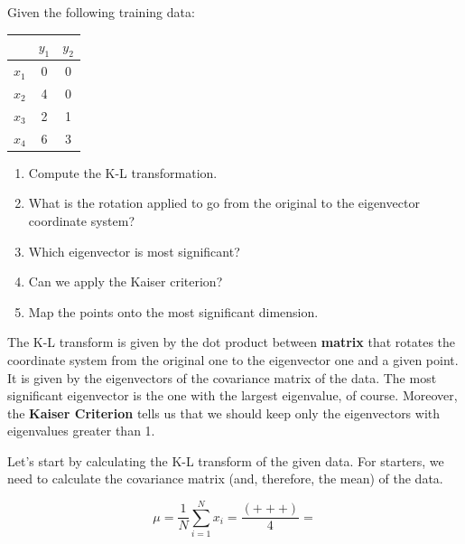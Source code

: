 \documentclass[12pt]{article}
\begin{document}
\begin{enumerate}[leftmargin=\labelsep]
  \begin{tcolorbox}[enhanced jigsaw,halign=center,colback=bg,boxrule=0pt,arc=1pt]
    \item Given the following training data:
    \begin{table}[H]
      \centering
      \begin{tabular}{c|c|c}
              & $y_1$ & $y_2$ \\ \hline
        $x_1$ & 0     & 0     \\
        $x_2$ & 4     & 0     \\
        $x_3$ & 2     & 1     \\
        $x_4$ & 6     & 3
      \end{tabular}
    \end{table}
    \begin{enumerate}
      \item Compute the K-L transformation.
      \item What is the rotation applied to go from the original to the eigenvector
            coordinate system?
      \item Which eigenvector is most significant?
      \item Can we apply the Kaiser criterion?
      \item Map the points onto the most significant dimension.
    \end{enumerate}
  \end{tcolorbox}

  The K-L transform is given by the dot product between \textbf{matrix} that rotates the coordinate system from
  the original one to the eigenvector one and a given point. It is given by the eigenvectors of the
  covariance matrix of the data. The most significant eigenvector is the one with
  the largest eigenvalue, of course. Moreover, the \textbf{Kaiser Criterion} tells us
  that we should keep only the eigenvectors with eigenvalues greater than 1.

  Let's start by calculating the K-L transform of the given data. For starters,
  we need to calculate the covariance matrix (and, therefore, the mean) of the data.

  \begin{equation*}
    \mu = \frac{1}{N} \sum_{i=1}^N x_i
    = \frac{\left(
       +
       +
       +
      
      \right)}{4}
    = 
  \end{equation*}


\end{enumerate}
\end{document}
